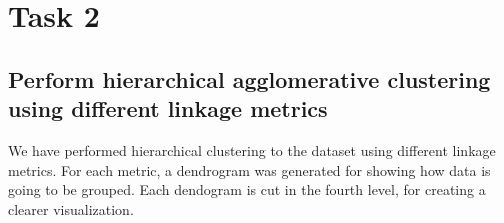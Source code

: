\documentclass[12pt]{article}
\begin{document}
\section{Task 2}

\subsection{Perform hierarchical agglomerative clustering using different linkage metrics}

We have performed hierarchical clustering to the dataset using different linkage metrics. For each metric, a dendrogram was generated for showing how data is going to be grouped. Each dendogram is cut in the fourth level, for creating a clearer visualization. 

\begin{figure} [H]
\centering
{}
\hspace{0mm}
\end{figure}
\end{document}
